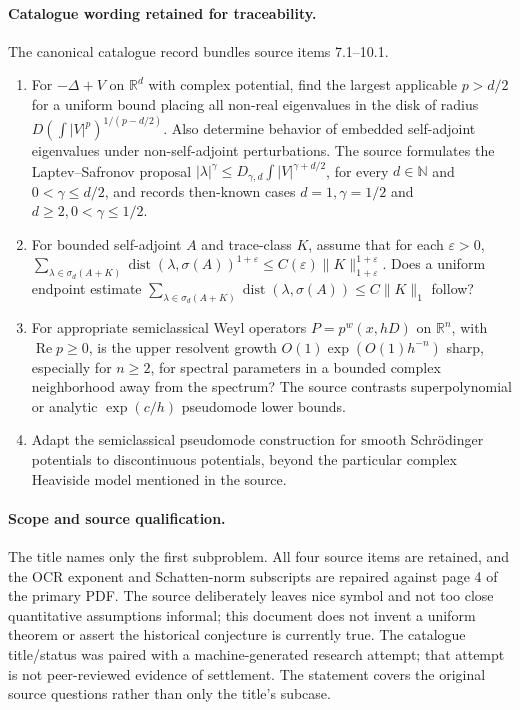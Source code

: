 \documentclass[11pt]{article}
\begin{document}
\paragraph{Catalogue wording retained for traceability.}
The canonical catalogue record bundles source items 7.1--10.1.
\begin{enumerate}
\item For $-\Delta+V$ on $\mathbb R^d$ with complex potential, find the largest applicable $p>d/2$ for a uniform bound placing all non-real eigenvalues in the disk of radius $D(\int|V|^p)^{1/(p-d/2)}$. Also determine behavior of embedded self-adjoint eigenvalues under non-self-adjoint perturbations. The source formulates the Laptev--Safronov proposal $|\lambda|^\gamma\le D_{\gamma,d}\int|V|^{\gamma+d/2}$, for every $d\in\mathbb N$ and $0<\gamma\le d/2$, and records then-known cases $d=1,\gamma=1/2$ and $d\ge2,0<\gamma\le1/2$.
\item For bounded self-adjoint $A$ and trace-class $K$, assume that for each $\varepsilon>0$, $\sum_{\lambda\in\sigma_d(A+K)}\operatorname{dist}(\lambda,\sigma(A))^{1+\varepsilon}\le C(\varepsilon)\|K\|_{1+\varepsilon}^{1+\varepsilon}$. Does a uniform endpoint estimate $\sum_{\lambda\in\sigma_d(A+K)}\operatorname{dist}(\lambda,\sigma(A))\le C\|K\|_1$ follow?
\item For appropriate semiclassical Weyl operators $P=p^w(x,hD)$ on $\mathbb R^n$, with $\operatorname{Re}p\ge0$, is the upper resolvent growth $O(1)\exp(O(1)h^{-n})$ sharp, especially for $n\ge2$, for spectral parameters in a bounded complex neighborhood away from the spectrum? The source contrasts superpolynomial or analytic $\exp(c/h)$ pseudomode lower bounds.
\item Adapt the semiclassical pseudomode construction for smooth Schrödinger potentials to discontinuous potentials, beyond the particular complex Heaviside model mentioned in the source.
\end{enumerate}
\paragraph{Scope and source qualification.}The title names only the first subproblem. All four source items are retained, and the OCR exponent and Schatten-norm subscripts are repaired against page 4 of the primary PDF. The source deliberately leaves nice symbol and not too close quantitative assumptions informal; this document does not invent a uniform theorem or assert the historical conjecture is currently true. The catalogue title/status was paired with a machine-generated research attempt; that attempt is not peer-reviewed evidence of settlement. The statement covers the original source questions rather than only the title’s subcase.
\end{document}
